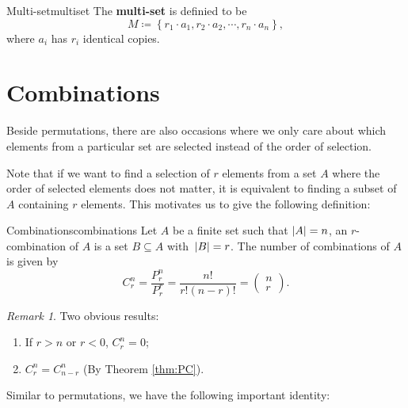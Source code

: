 \documentclass[math]{amznotes}
\theoremstyle{remark}
\newtheorem*{remark}{Remark}
\begin{document}
\begin{dfnbox}{Multi-set}{multiset}
    The {\color{red} \textbf{multi-set}} is definied to be
    \begin{equation*}
        M \coloneqq \left\{r_1 \cdot a_1, r_2 \cdot a_2, \cdots, r_n \cdot a_n\right\},
    \end{equation*}
    where $a_i$ has $r_i$ identical copies.
\end{dfnbox}
\section{Combinations}
Beside permutations, there are also occasions where we only care about which elements from a particular set are selected instead of the order of selection.

Note that if we want to find a selection of $r$ elements from a set $A$ where the order of selected elements does not matter, it is equivalent to finding a subset of $A$ containing $r$ elements. This motivates us to give the following definition:
\begin{dfnbox}{Combinations}{combinations}
    Let $A$ be a finite set such that ${\left\lvert {A} \right\rvert} = n$, an $r$-combination of $A$ is a set $B \subseteq A$ with~${\left\lvert {B} \right\rvert} = r$. The number of combinations of $A$ is given by
    \begin{equation*}
        C^n_r = \frac{P^n_r}{P^r_r} = \frac{n!}{r!(n - r)!} = \begin{pmatrix}
            n \\
            r
        \end{pmatrix}.
    \end{equation*}
\end{dfnbox}
\begin{notebox}
    \begin{remark}
        Two obvious results:
        \begin{enumerate}
            \item If $r > n$ or $r < 0$, $C^n_r = 0$;
            \item $C^n_r = C^n_{n - r}$ (By Theorem \ref{thm:PC}).
        \end{enumerate}
    \end{remark}
\end{notebox}
Similar to permutations, we have the following important identity:
\end{document}
